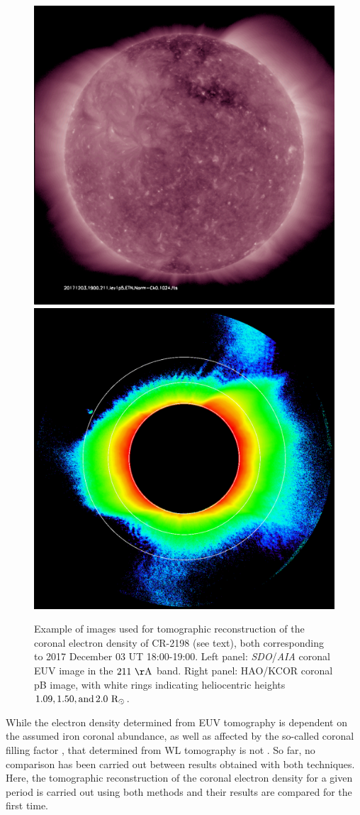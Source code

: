 \documentclass[baaa]{baaa}
\begin{document}
\begin{figure}[ht]
  \centering
  \includegraphics[width=0.64\columnwidth]{img_211.pdf}
  \hskip 1.5cm
  \includegraphics[width=0.64\columnwidth]{20171203_180316_kcor_l1_10min_avg_image.pdf}
  \caption{Example of images used for tomographic reconstruction of the coronal electron density of CR-2198 (see text), both corresponding to 2017 December 03 UT 18:00-19:00. Left panel: \textsl{SDO}/\textsl{AIA} coronal EUV image in the $211~\rm{\AA}$ band. Right panel: HAO/KCOR coronal pB image, with white rings indicating heliocentric heights $1.09, 1.50, \rm{and}\, 2.0~\rm{R}_\odot$.}
  \label{fig_images}
\end{figure}

While the electron density determined from EUV tomography is dependent on the assumed iron coronal abundance, as well as affected by the so-called coronal filling factor \citep{frazin_2009}, that determined from WL tomography is not \citep{frazin_2010}. So far, no comparison has been carried out between results obtained with both techniques. Here, the tomographic reconstruction of the coronal electron density for a given period is carried out using both methods and their results are compared for the first time.
\end{document}

